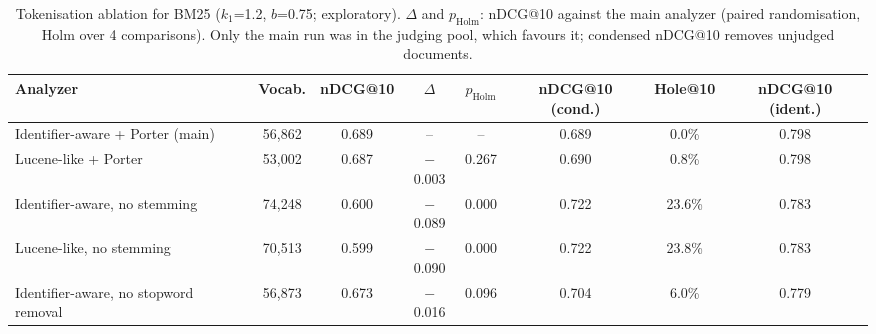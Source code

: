 \begin{table}[t]
\centering
\small
\caption{Tokenisation ablation for BM25 ($k_1$=1.2, $b$=0.75; exploratory). $\Delta$ and $p_{\text{Holm}}$: nDCG@10 against the main analyzer (paired randomisation, Holm over 4 comparisons). Only the main run was in the judging pool, which favours it; condensed nDCG@10 removes unjudged documents.}
\label{tab:rq5tok}
\begin{tabular}{lccccccc}
\toprule
Analyzer & Vocab. & nDCG@10 & $\Delta$ & $p_{\text{Holm}}$ & nDCG@10 (cond.) & Hole@10 & nDCG@10 (ident.) \\
\midrule
Identifier-aware + Porter (main) & 56,862 & 0.689 & -- & -- & 0.689 & 0.0\% & 0.798 \\
Lucene-like + Porter & 53,002 & 0.687 & $-$0.003 & 0.267 & 0.690 & 0.8\% & 0.798 \\
Identifier-aware, no stemming & 74,248 & 0.600 & $-$0.089 & 0.000 & 0.722 & 23.6\% & 0.783 \\
Lucene-like, no stemming & 70,513 & 0.599 & $-$0.090 & 0.000 & 0.722 & 23.8\% & 0.783 \\
Identifier-aware, no stopword removal & 56,873 & 0.673 & $-$0.016 & 0.096 & 0.704 & 6.0\% & 0.779 \\
\bottomrule
\end{tabular}
\end{table}
